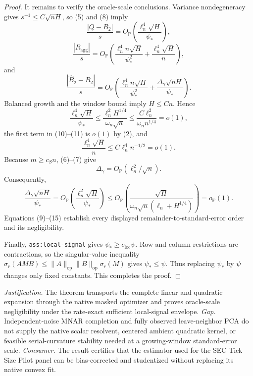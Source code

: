 \documentclass{article}
\begin{document}
\begin{proof}
It remains to verify the oracle-scale conclusions.  Variance nondegeneracy gives \(s^{-1}\le C\sqrt{nH}\), so (5) and (8) imply
\[
 \frac{|Q-B_2|}{s}
 =O_{\mathbb P}\!\left(\frac{\ell_n^4\sqrt H}{\psi_*}\right),
 \tag{9}
\]
\[
 \frac{|R_{\mathrm{agg}}|}{s}
 =O_{\mathbb P}\!\left(
 \frac{\ell_n^4n\sqrt H}{\psi_*^2}
 +\frac{\ell_n^4\sqrt H}{n}\right),
 \tag{10}
\]
and
\[
 \frac{|\widehat B_2-B_2|}{s}
 =O_{\mathbb P}\!\left(
 \frac{\ell_n^4n\sqrt H}{\psi_*^2}
 +\frac{\Delta_\gamma\sqrt{nH}}{\psi_*}\right).
 \tag{11}
\]
Balanced growth and the window bound imply \(H\le Cn\).  Hence
\[
 \frac{\ell_n^4\sqrt H}{\psi_*}
 \le\frac{\ell_n^2H^{1/4}}{\omega_n\sqrt n}
 \le\frac{C\ell_n^2}{\omega_n n^{1/4}}=o(1),
 \tag{12}
\]
the first term in (10)--(11) is \(o(1)\) by (2), and
\[
 \frac{\ell_n^4\sqrt H}{n}\le C\ell_n^4n^{-1/2}=o(1).
 \tag{13}
\]
Because \(m\ge c_Sn\), (6)--(7) give
\[
 \Delta_\gamma=O_{\mathbb P}(\ell_n^2/\sqrt n).
 \tag{14}
\]
Consequently,
\[
 \frac{\Delta_\gamma\sqrt{nH}}{\psi_*}
 =O_{\mathbb P}\!\left(\frac{\ell_n^2\sqrt H}{\psi_*}\right)
 \le O_{\mathbb P}\!\left(
 \frac{\sqrt H}{\omega_n\sqrt n(\ell_n+H^{1/4})}\right)
 =o_{\mathbb P}(1).
 \tag{15}
\]
Equations (9)--(15) establish every displayed remainder-to-standard-error order and its negligibility.

Finally, \texttt{ass:local-signal} gives \(\psi_*\ge c_{\mathrm{loc}}\psi\).  Row and column restrictions are contractions, so the singular-value inequality \(\sigma_r(AMB)\le\|A\|_{\mathrm{op}}\|B\|_{\mathrm{op}}\sigma_r(M)\) gives \(\psi_*\le\psi\).  Thus replacing \(\psi_*\) by \(\psi\) changes only fixed constants.  This completes the proof.
\end{proof}
\par\smallskip\noindent \textit{Justification.} The theorem transports the complete linear and quadratic expansion through the native masked optimizer and proves oracle-scale negligibility under the rate-exact sufficient local-signal envelope. \textit{Gap.} Independent-noise MNAR completion and fully observed leave-neighbor PCA do not supply the native scalar resolvent, centered ambient quadratic kernel, or feasible serial-curvature stability needed at a growing-window standard-error scale. \textit{Consumer.} The result certifies that the estimator used for the SEC Tick Size Pilot panel can be bias-corrected and studentized without replacing its native convex fit.
\end{document}
